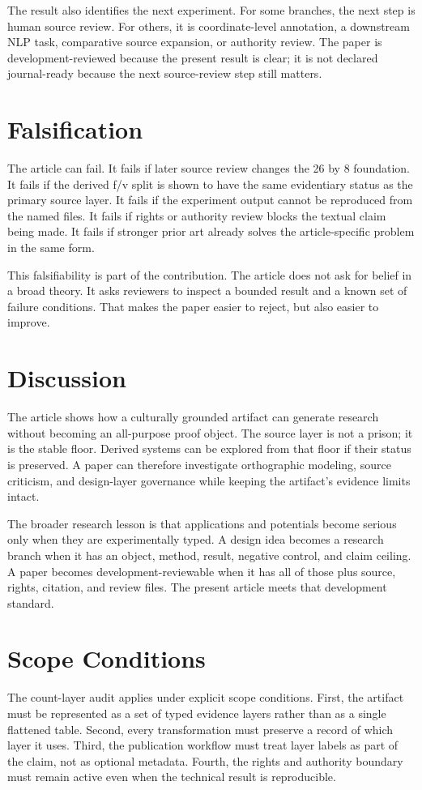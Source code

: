 \documentclass[sigconf,nonacm]{acmart}
\begin{document}
The result also identifies the next experiment. For some branches, the next step
is human source review. For others, it is coordinate-level annotation, a
downstream NLP task, comparative source expansion, or authority review. The
paper is development-reviewed because the present result is clear; it is not
declared journal-ready because the next source-review step still matters.

\section{Falsification}
The article can fail. It fails if later source review changes the 26 by 8
foundation. It fails if the derived f/v split is shown to have the same
evidentiary status as the primary source layer. It fails if the experiment output
cannot be reproduced from the named files. It fails if rights or authority review
blocks the textual claim being made. It fails if stronger prior art already
solves the article-specific problem in the same form.

This falsifiability is part of the contribution. The article does not ask for
belief in a broad theory. It asks reviewers to inspect a bounded result and a
known set of failure conditions. That makes the paper easier to reject, but also
easier to improve.

\section{Discussion}
The article shows how a culturally grounded artifact can generate research
without becoming an all-purpose proof object. The source layer is not a prison;
it is the stable floor. Derived systems can be explored from that floor if their
status is preserved. A paper can therefore investigate orthographic modeling, source criticism, and design-layer governance while keeping the
artifact's evidence limits intact.

The broader research lesson is that applications and potentials become serious
only when they are experimentally typed. A design idea becomes a research branch
when it has an object, method, result, negative control, and claim ceiling. A
paper becomes development-reviewable when it has all of those plus source,
rights, citation, and review files. The present article meets that development
standard.


\section{Scope Conditions}
The count-layer audit applies under explicit scope conditions. First, the artifact must be
represented as a set of typed evidence layers rather than as a single flattened
table. Second, every transformation must preserve a record of which layer it
uses. Third, the publication workflow must treat layer labels as part of the
claim, not as optional metadata. Fourth, the rights and authority boundary must
remain active even when the technical result is reproducible.
\end{document}
